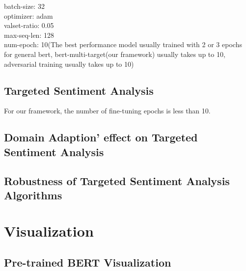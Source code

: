 \documentclass[fyp]{socreport}
\begin{document}
batch-size: 32\\
optimizer: adam\\
valset-ratio: 0.05\\
max-seq-len: 128\\
num-epoch: 10(The best performance model usually trained with 2 or 3 epochs for general bert, bert-multi-target(our framework) usually takes up to 10, adversarial training usually takes up to 10)\\

\subsection{Targeted Sentiment Analysis}
For our framework, the number of fine-tuning epochs is less than 10.


\subsection{Domain Adaption' effect on Targeted Sentiment Analysis}


\subsection{Robustness of Targeted Sentiment Analysis Algorithms}











\section{Visualization}
\subsection{Pre-trained BERT Visualization}
\end{document}
